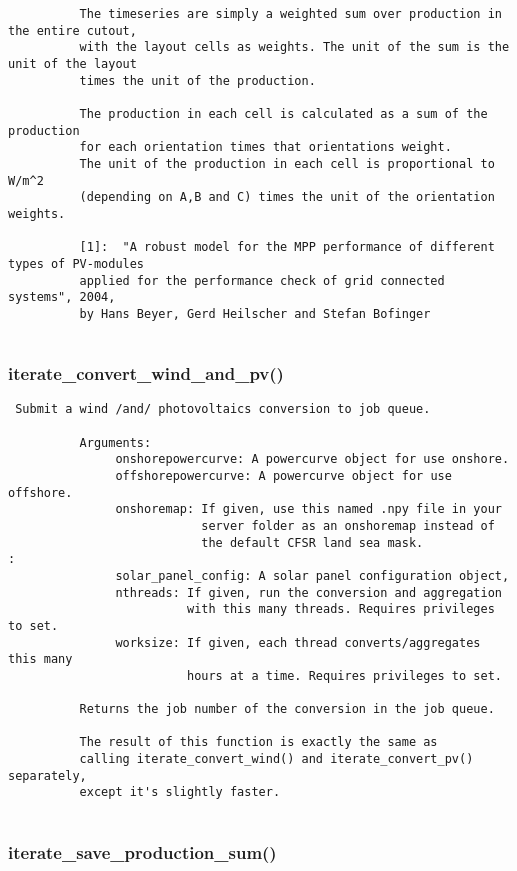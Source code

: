 \begin{verbatim}
          The timeseries are simply a weighted sum over production in the entire cutout,
          with the layout cells as weights. The unit of the sum is the unit of the layout
          times the unit of the production.

          The production in each cell is calculated as a sum of the production
          for each orientation times that orientations weight.
          The unit of the production in each cell is proportional to W/m^2
          (depending on A,B and C) times the unit of the orientation weights.

          [1]:  "A robust model for the MPP performance of different types of PV-modules
          applied for the performance check of grid connected systems", 2004,
          by Hans Beyer, Gerd Heilscher and Stefan Bofinger
          
\end{verbatim}
\subsubsection{iterate\_convert\_wind\_and\_pv()}


\begin{verbatim}
 Submit a wind /and/ photovoltaics conversion to job queue.

          Arguments:
               onshorepowercurve: A powercurve object for use onshore.
               offshorepowercurve: A powercurve object for use offshore.
               onshoremap: If given, use this named .npy file in your
                           server folder as an onshoremap instead of
                           the default CFSR land sea mask.
:
               solar_panel_config: A solar panel configuration object,
               nthreads: If given, run the conversion and aggregation
                         with this many threads. Requires privileges to set.
               worksize: If given, each thread converts/aggregates this many
                         hours at a time. Requires privileges to set.

          Returns the job number of the conversion in the job queue.

          The result of this function is exactly the same as
          calling iterate_convert_wind() and iterate_convert_pv() separately,
          except it's slightly faster.
          
\end{verbatim}
\subsubsection{iterate\_save\_production\_sum()}


